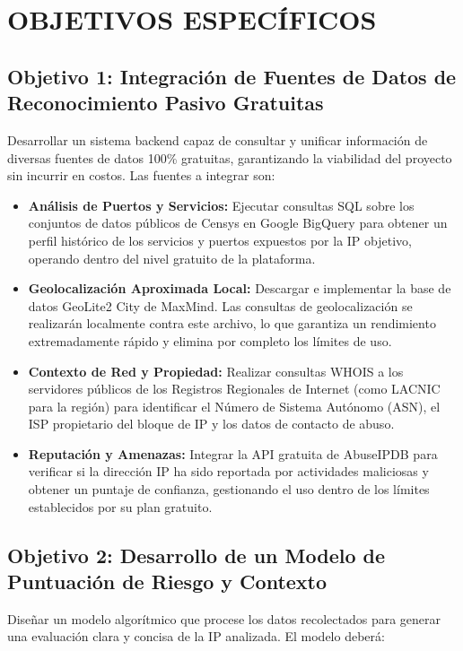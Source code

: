 \section{OBJETIVOS ESPECÍFICOS}

\subsection{Objetivo 1: Integración de Fuentes de Datos de Reconocimiento Pasivo Gratuitas}
Desarrollar un sistema backend capaz de consultar y unificar información de diversas fuentes de datos 100\% gratuitas, garantizando la viabilidad del proyecto sin incurrir en costos. Las fuentes a integrar son:

\begin{itemize}
    \item \textbf{Análisis de Puertos y Servicios:} Ejecutar consultas SQL sobre los conjuntos de datos públicos de Censys en Google BigQuery para obtener un perfil histórico de los servicios y puertos expuestos por la IP objetivo, operando dentro del nivel gratuito de la plataforma.
    \item \textbf{Geolocalización Aproximada Local:} Descargar e implementar la base de datos GeoLite2 City de MaxMind. Las consultas de geolocalización se realizarán localmente contra este archivo, lo que garantiza un rendimiento extremadamente rápido y elimina por completo los límites de uso.
    \item \textbf{Contexto de Red y Propiedad:} Realizar consultas WHOIS a los servidores públicos de los Registros Regionales de Internet (como LACNIC para la región) para identificar el Número de Sistema Autónomo (ASN), el ISP propietario del bloque de IP y los datos de contacto de abuso.
    \item \textbf{Reputación y Amenazas:} Integrar la API gratuita de AbuseIPDB para verificar si la dirección IP ha sido reportada por actividades maliciosas y obtener un puntaje de confianza, gestionando el uso dentro de los límites establecidos por su plan gratuito.
\end{itemize}

\subsection{Objetivo 2: Desarrollo de un Modelo de Puntuación de Riesgo y Contexto}
Diseñar un modelo algorítmico que procese los datos recolectados para generar una evaluación clara y concisa de la IP analizada. El modelo deberá:

